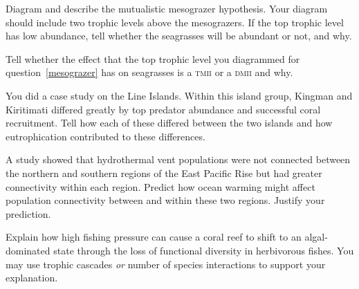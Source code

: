 %
\question[15]\label{mesograzer}
Diagram and describe the mutualistic mesograzer hypothesis. Your diagram should include two trophic levels above the mesograzers. If the top trophic level has low abundance, tell whether the seagrasses will be abundant or not, and why.


\question[5]
Tell whether the effect that the top trophic level you diagrammed for question~\ref{mesograzer} has on seagrasses is a \textsc{tmii} or a \textsc{dmii} and why.





\question[10]
You did a case study on the Line Islands. Within this island group, 
Kingman and Kiritimati differed greatly by top predator abundance 
and successful coral recruitment. Tell how each of these differed 
between the two islands and how eutrophication contributed to these 
differences.



\question[10]
A study showed that hydrothermal vent populations were not connected 
between the northern and southern regions of the East Pacific Rise but
had greater connectivity within each region. Predict how ocean warming
might affect population connectivity between and within these two regions.
Justify your prediction.




\question[10]
Explain how high fishing pressure can cause a coral reef to shift to 
an algal-dominated state through the loss of functional diversity
in herbivorous fishes. You may use trophic cascades \emph{or} number
of species interactions to support your explanation.


